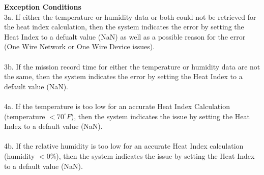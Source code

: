\documentclass[letterpaper]{article}
\begin{document}
\textbf{Exception Conditions}\\
3a.  If either the temperature or humidity data or both could not
be retrieved for the heat index calculation, then the system
indicates the error by setting the Heat Index to a defualt value
(NaN) as well as a possible reason for the error (One Wire Network
or One Wire Device issues).\\\\
3b.  If the mission record time for either the temperature or
humidity data are not the same, then the system indicates the
error by setting the Heat Index to a default value (NaN).\\\\
4a.  If the temperature is too low for an accurate Heat Index
Calculation (temperature $< 70^{\circ}F$), then the system indicates
the issue by setting the Heat Index to a default value (NaN).\\\\
4b.  If the relative humidity is too low for an accurate Heat Index
calculation (humidity $< 0\%$), then the system indicates the issue
by setting the Heat Index to a default value (NaN).
\end{document}
